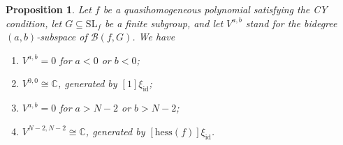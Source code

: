 \documentclass[10pt,a4paper]{amsart}
\numberwithin{equation}{section}
\newtheorem{Proposition}[Theorem]{Proposition}
 { \theoremstyle{definition}
\newtheorem{Definition}[Theorem]{Definition}
\newtheorem{Note}[Theorem]{Note}
\newtheorem{Example}[Theorem]{Example}
\newtheorem{Remark}[Theorem]{Remark} }
\newcommand{\CC}{{\mathbb{C}}}
\newcommand{\SL}{{\mathrm{SL}}}
\newcommand{\id}{\mathrm{id}}
\newcommand{\hess}{\mathrm{hess}}
\def\B{{\mathcal B}}
\begin{document}
\begin{Proposition}\label{proposition: diamond under CY}
	Let $f$ be a quasihomogeneous polynomial satisfying the CY condition, let $G \subseteq \SL_f$ be a finite subgroup, and let $V^{a,b}$ stand for the bidegree $(a,b)$-subspace of $\B(f,G)$. We have
	\begin{enumerate}\itemsep=0pt
	 \item[$(i)$] $V^{a,b} = 0$ for $a < 0$ or $b < 0$;
	 \item[$(ii)$] $V^{0,0} \cong \CC$, generated by $[1]\xi_\id$;
	 \item[$(iii)$] $V^{a,b} = 0$ for $a > N-2$ or $b > N-2$;
	 \item[$(iv)$] $V^{N-2,N-2} \cong \CC$, generated by $[\hess(f)]\xi_\id$.
	\end{enumerate}

\end{Proposition}
\end{document}
